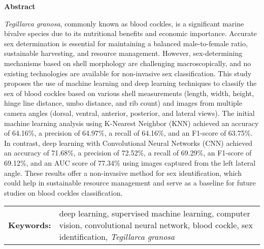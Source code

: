 \begin{center}
	\textbf{Abstract}
\end{center}
\setlength{\parindent}{0pt}
\textit{Tegillarca granosa}, commonly known as blood cockles, is a significant marine bivalve species due to its nutritional benefits and economic importance. Accurate sex determination is essential for maintaining a balanced male-to-female ratio, sustainable harvesting, and resource management. However, sex-determining mechanisms based on shell morphology are challenging macroscopically, and no existing technologies are available for non-invasive sex classification.  This study proposes the use of machine learning and deep learning techniques to classify the sex of blood cockles based on various shell measurements (length, width, height, hinge line distance, umbo distance, and rib count) and images from multiple camera angles (dorsal, ventral, anterior, posterior, and lateral views). The initial machine learning analysis using K-Nearest Neighbor (KNN) achieved an accuracy of 64.16\%, a precision of 64.97\%, a recall of 64.16\%, and an F1-score of 63.75\%. In contrast, deep learning with Convolutional Neural Networks (CNN) achieved an accuracy of 71.68\%, a precision of 72.52\%, a recall of 69.29\%, an F1-score of 69.12\%, and an AUC score of 77.34\% using images captured from the left lateral angle. These results offer a non-invasive method for sex identification, which could help in sustainable resource management and serve as a baseline for future studies on blood cockles classification.


\begin{tabular}{lp{4.25in}}
	\hspace{-0.5em}\textbf{Keywords:}\hspace{0.25em} & deep learning, supervised machine learning, computer vision, convolutional neural network, blood cockle, sex identification, \textit{Tegillarca granosa}\\
\end{tabular}
